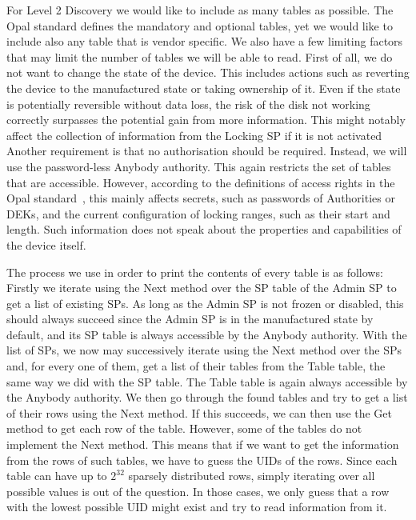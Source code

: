 For Level 2 Discovery we would like to include as many tables as possible. The Opal standard defines the mandatory and optional  tables, yet we would like to include also any table that is vendor specific.
We also have a few limiting factors that may limit the number of tables we will be able to read.
First of all, we do not want to change the state of the device. This includes actions such as reverting the device to the manufactured state or taking ownership of it. Even if the state is potentially reversible without data loss, the risk of the disk not working correctly surpasses the potential gain from more information. This might notably affect the collection of information from the Locking SP if it is not activated
Another requirement is that no authorisation should be required. Instead, we will use the password-less Anybody authority. This again restricts the set of tables that are accessible. However, according to the definitions of access rights in the Opal standard~\cite{tcg-opal2}, this mainly affects secrets, such as passwords of Authorities or DEKs, and the current configuration of locking ranges, such as their start and length. Such information does not speak about the properties and capabilities of the device itself.

The process we use in order to print the contents of every table is as follows:
Firstly we iterate using the Next method over the SP table of the Admin SP to get a list of existing SPs. As long as the Admin SP is not frozen or disabled, this should always succeed since the Admin SP is in the manufactured state by default, and its SP table is always accessible by the Anybody authority. 
With the list of SPs, we now may successively iterate using the Next method over the SPs and, for every one of them, get a list of their tables from the Table table, the same way we did with the SP table. The Table table is again always accessible by the Anybody authority.
We then go through the found tables and try to get a list of their rows using the Next method. If this succeeds, we can then use the Get method to get each row of the table. However, some of the tables do not implement the Next method. This means that if we want to get the information from the rows of such tables, we have to guess the UIDs of the rows. Since each table can have up to $2^{32}$ sparsely distributed rows, simply iterating over all possible values is out of the question. In those cases, we only guess that a row with the lowest possible UID might exist and try to read information from it.

